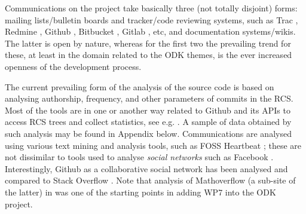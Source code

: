 \documentclass{deliverablereport}
\begin{document}
Communications on the project take basically three (not totally disjoint)
forms: mailing lists/bulletin
boards and tracker/code reviewing systems,
such as Trac \cite{wp7:trac}, Redmine \cite{wp7:redmine},
Github \cite{wp7:github},
Bitbucket \cite{wp7:bitbucket}, Gitlab \cite{wp7:gitlab},
etc, and documentation
systems/wikis. The latter is open by nature, whereas for the first two
the prevailing trend for these, at least in the domain related to the
ODK themes, is the ever increased
openness of the development process.

The current prevailing form of the analysis of the source code is based on
analysing authorship, frequency, and other parameters of commits in the RCS.
Most of the tools are in one or another way related to Github and its APIs to
access RCS trees and collect statistics, see e.g. \cite{wp7:arfonshapeoss}.
A sample of data obtained by such analysis may be found in Appendix below.
Communications are analysed using various text mining and analysis tools, such
as FOSS Heartbeat \cite{wp7:fossheartbeat}; these are not dissimilar to tools
used to analyse {\em social networks} such as Facebook
\cite{wp7:russell2013mining}.  Interestingly, Github as a collaborative social
network has been analysed \cite{wp7:githubandsof, DBLP:journals/corr/LimaRM14,
DBLP:journals/corr/VasilescuSWSB15, wp7:Kalliamvakou:2014:PPM:2597073.2597074}
and compared to Stack Overflow \cite{wp7:stackoverflow}. Note that analysis of
Mathoverflow (a sub-site of the latter) in \cite{MarPea:wmtapm13} was one of
the starting points in adding WP7 into the ODK project.
\end{document}
